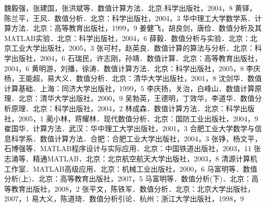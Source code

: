 \begin{thebibliography}{99}
魏毅强，张建国，张洪斌等．数值计算方法．北京:科学出版社，2004，8
黄铎，陈兰平，王风．数值分析．北京：科学出版社，2004，3
华中理工大学数学系．计算方法．北京：高等教育出版社，1999，9
姜健飞，胡良剑，唐俭．数值分析及其MATLAB实验．北京：科学出版社，2004，6
薛毅．数值分析与实验．北京：北京工业大学出版社，2005，3
张可村，赵英良．数值计算的算法与分析．北京：科学出版社，2004，6
石瑞民，许志刚，孙靖．数值计算．北京：高等教育出版社，2004，6
黄明游，刘播，徐涛．数值计算方法．北京：科学出版社，2005，8
李庆杨，王能超，易大义．数值分析．北京：清华大学出版社，2001，8
沈剑华．数值计算基础．上海：同济大学出版社，1999，5
李庆扬，关治，白峰山．数值计算原理．北京：清华大学出版社，2000，9
吴勃英，王德明，丁效华，李道华．数值分析原理．北京：科学出版社，2004，2
林成森．数值计算方法．北京：科学出版社，2005，1
蔺小林，蒋耀林．现代数值分析．北京：国防工业出版社，2004，9
崔国华．计算方法．武汉：华中理工大学出版社，2001，3
合肥工业大学数学与信息科学系．数值计算方法．合肥：合肥工业大学出版社，2004，3
张铮，杨文平，石博强等．MATLAB程序设计与实际应用．北京：中国铁道出版社，2003，11
张志涌等．精通MATLAB．北京：北京航空航天大学出版社，2003，8
清源计算机工作室．MATLAB高级应用．北京：机械工业出版社，2000，6
马富明等．数值分析(上)．北京：高等教育出版社，2007，5
马富明等．数值分析(下)．北京：高等教育出版社，2008，2
张平文，陈铁军．数值分析．北京：北京大学出版社，2007，1
易大义，陈道琦．数值分析引论．杭州：浙江大学出版社，1998，9
\end{thebibliography}
